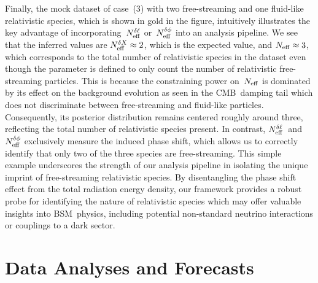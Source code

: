 Finally, the mock dataset of case~(3) with two free-streaming and one fluid-like relativistic species, which is shown in gold in the figure, intuitively illustrates the key advantage of incorporating~$N_\mathrm{eff}^{\delta\ell}$ or~$N_\mathrm{eff}^{\delta\phi}$ into an analysis pipeline. We see that the inferred values are $N_\mathrm{eff}^{\delta X} \approx 2$, which is the expected value, and $N_\mathrm{eff} \approx 3$, which corresponds to the total number of relativistic species in the dataset even though the parameter is defined to only count the number of relativistic free-streaming particles. This is because the constraining power on~$N_\mathrm{eff}$ is dominated by its effect on the background evolution as seen in the CMB~damping tail which does not discriminate between free-streaming and fluid-like particles. Consequently, its posterior distribution remains centered roughly around three, reflecting the total number of relativistic species present. In contrast, $N_\mathrm{eff}^{\delta\ell}$~and~$N_\mathrm{eff}^{\delta\phi}$ exclusively measure the induced phase shift, which allows us to correctly identify that only two of the three species are free-streaming. This simple example underscores the strength of our analysis pipeline in isolating the unique imprint of free-streaming relativistic species. By disentangling the phase shift effect from the total radiation energy density, our framework provides a robust probe for identifying the nature of relativistic species which may offer valuable insights into BSM~physics, including potential non-standard neutrino interactions or couplings to a dark sector.




\section{Data Analyses and Forecasts}
\label{ch12-sec:analysis-forecasts}

